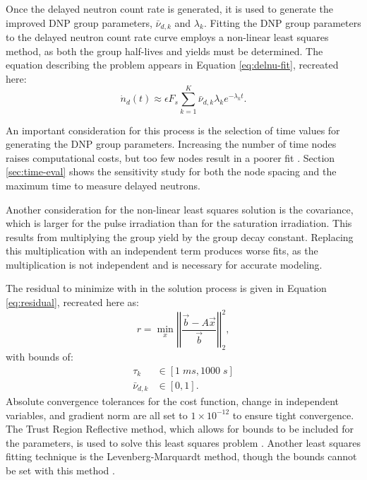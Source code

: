 Once the delayed neutron count rate is generated, it is used to generate the improved \gls{DNP} group parameters, $\bar{\nu}_{d, k}$ and $\lambda_k$.
Fitting the \gls{DNP} group parameters to the delayed neutron count rate curve employs a non-linear least squares method, as both the group half-lives and yields must be determined.
The equation describing the problem appears in Equation \eqref{eq:delnu-fit}, recreated here:
\begin{equation}
\dot{n}_d(t) \approx \epsilon F_s \sum_{k=1}^{K}  \bar{\nu}_{d, k} \lambda_k e^{-\lambda_k t}.
\nonumber
\end{equation}

An important consideration for this process is the selection of time values for generating the \gls{DNP} group parameters.
Increasing the number of time nodes raises computational costs, but too few nodes result in a poorer fit \cite{parish1999status}.
Section \ref{sec:time-eval} shows the sensitivity study for both the node spacing and the maximum time to measure delayed neutrons.

Another consideration for the non-linear least squares solution is the covariance, which is larger for the pulse irradiation than for the saturation irradiation.
This results from multiplying the group yield by the group decay constant.
Replacing this multiplication with an independent term produces worse fits, as the multiplication is not independent and is necessary for accurate modeling.

The residual to minimize with in the solution process is given in Equation \eqref{eq:residual}, recreated here as:
\begin{equation}
    r = \min_x \left| \left| \frac{\vec{b} - A\vec{x}}{\vec{b}} \right| \right|_2^2,
\end{equation}
with bounds of:
\begin{align}
    \tau_k &\in [1\; ms, 1000 \;s] \nonumber \\
    \bar{\nu}_{d,k} & \in [0, 1] \nonumber.
\end{align}
Absolute convergence tolerances for the cost function, change in independent variables, and gradient norm are all set to $1\times10^{-12}$ to ensure tight convergence.
The Trust Region Reflective method, which allows for bounds to be included for the parameters, is used to solve this least squares problem \cite{branch1999subspace}.
Another least squares fitting technique is the Levenberg-Marquardt method, though the bounds cannot be set with this method \cite{levenberg1944method, marquardt1963algorithm, mills2014calculation}.

